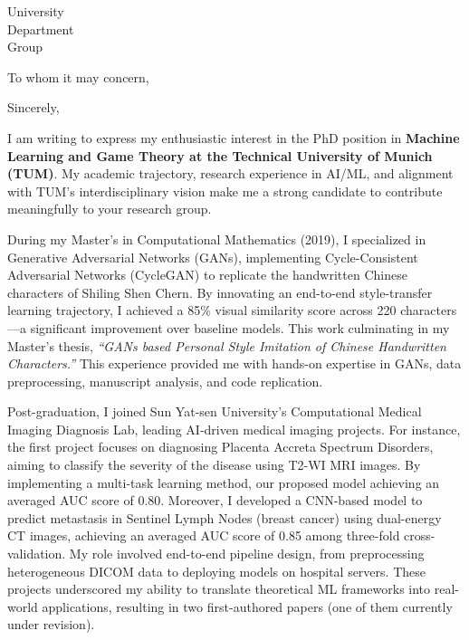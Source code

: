 \documentclass[11pt,a4paper, final]{moderncv}
\begin{document}
{University\\
Department \\
Group}
\date{\today}
\opening{To whom it may concern,}
\closing{Sincerely,}
\makelettertitle
\thispagestyle{empty}
\pagestyle{empty}
I am writing to express my enthusiastic interest in the PhD position in 
\textbf{Machine Learning and Game Theory at the Technical University of Munich (TUM)}. 
My academic trajectory, research experience in AI/ML, 
and alignment with TUM's interdisciplinary vision make me a strong candidate 
to contribute meaningfully to your research group.

During my Master's in Computational Mathematics (2019), 
I specialized in Generative Adversarial Networks (GANs), 
implementing Cycle-Consistent Adversarial Networks (CycleGAN) 
to replicate the handwritten Chinese characters of Shiling Shen Chern. 
By innovating an end-to-end style-transfer learning trajectory, 
I achieved a 85\% visual similarity score across 220 characters—a significant improvement over baseline models. 
This work culminating in my Master's thesis, 
\emph{``GANs based Personal Style Imitation of Chinese Handwritten Characters.''} 
This experience provided me with hands-on expertise in GANs, 
data preprocessing, manuscript analysis, and code replication. 

Post-graduation, I joined Sun Yat-sen University's Computational Medical Imaging Diagnosis Lab, 
leading AI-driven medical imaging projects. 
For instance, the first project focuses on diagnosing Placenta Accreta Spectrum Disorders, 
aiming to classify the severity of the disease using T2-WI MRI images. 
By implementing a multi-task learning method, 
our proposed model achieving an averaged AUC score of 0.80. 
Moreover, 
I developed a CNN-based model to predict metastasis in Sentinel Lymph Nodes (breast cancer) using dual-energy CT images, 
achieving an averaged AUC score of 0.85 among three-fold cross-validation. 
My role involved end-to-end pipeline design, 
from preprocessing heterogeneous DICOM data to deploying models on hospital servers. 
These projects underscored my ability to translate theoretical ML frameworks into real-world applications, 
resulting in two first-authored papers (one of them currently under revision).
\end{document}
